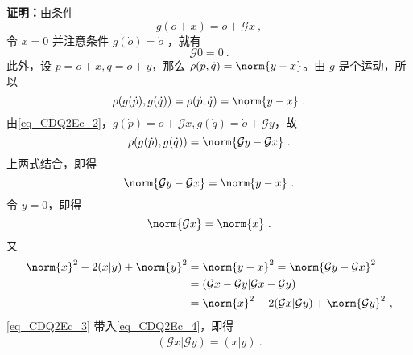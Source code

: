 \textbf{证明：}由条件
\begin{equation}\label{eq_CDQ2Ec_2}
g(\dot o+x)=\dot o+\mathcal G x~,
\end{equation}
令 $x=0$ 并注意条件 $g(\dot o)=\dot o$ ，就有
\begin{equation}
\mathcal G 0=0~.
\end{equation}
此外，设 $\dot p=\dot o+x,\dot q=\dot o+y$，那么 $\rho(\dot p,\dot q)=\norm{y-x}$。由 $g$ 是个运动，所以
\begin{equation}
\rho(g(\dot p),g(\dot q))=\rho(\dot p,\dot q)=\norm{y-x}~.
\end{equation}
由\autoref{eq_CDQ2Ec_2}，$g(\dot p)=\dot o+\mathcal G x, g(\dot q)=\dot o+\mathcal G y$，故
\begin{equation}
\rho(g(\dot p),g(\dot q))=\norm{\mathcal Gy-\mathcal Gx}~.
\end{equation}
上两式结合，即得
\begin{equation}
\norm{\mathcal Gy-\mathcal Gx}=\norm{y-x}~.
\end{equation}
令 $y=0$，即得
\begin{equation}\label{eq_CDQ2Ec_3}
\norm{\mathcal G x}=\norm{x}~.
\end{equation}
又
\begin{equation}\label{eq_CDQ2Ec_4}
\begin{aligned}
\norm{x}^2-2(x|y)+\norm{y}^2&=\norm{y-x}^2=\norm{\mathcal G y-\mathcal G x}^2\\
&=(\mathcal G x-\mathcal G y|\mathcal G x-\mathcal G y)\\
&=\norm{x}^2-2(\mathcal G x|\mathcal G y)+\norm{\mathcal G y}^2~,
\end{aligned}
\end{equation}
\autoref{eq_CDQ2Ec_3} 带入\autoref{eq_CDQ2Ec_4}，即得
\begin{equation}\label{eq_CDQ2Ec_5}
\begin{aligned}
(\mathcal G x|\mathcal G y)=(x|y)~.
\end{aligned}
\end{equation}

